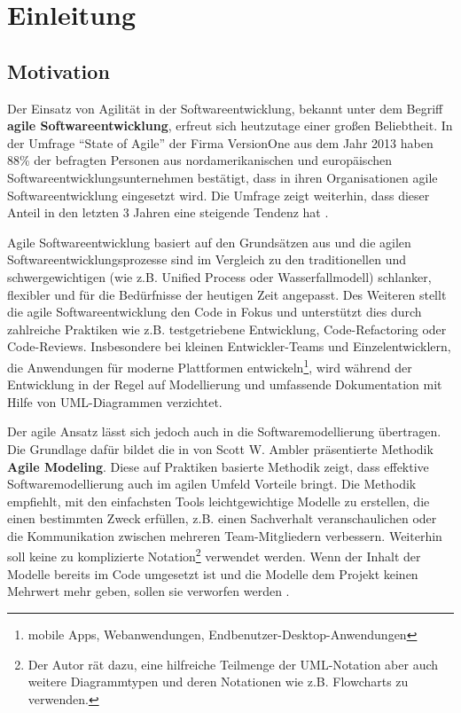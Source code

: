 
\chapter{Einleitung}
\label{chapter:introduction}

\section{Motivation}

Der Einsatz von Agilität in der Softwareentwicklung, bekannt unter dem Begriff \textbf{agile Softwareentwicklung}, erfreut sich heutzutage einer großen Beliebtheit. In der Umfrage \enquote{State of Agile} der Firma VersionOne aus dem Jahr 2013 haben 88\% der befragten Personen aus nordamerikanischen und europäischen Softwareentwicklungsunternehmen bestätigt, dass in ihren Organisationen agile Softwareentwicklung eingesetzt wird. Die Umfrage zeigt weiterhin, dass dieser Anteil in den letzten 3 Jahren eine steigende Tendenz hat \cite{VersionOne148th-Annual}.

Agile Softwareentwicklung basiert auf den Grundsätzen aus \cite{BeckBeedle01Manifest} und die agilen Softwareentwicklungsprozesse sind im Vergleich zu den traditionellen und schwergewichtigen (wie z.B. Unified Process oder Wasserfallmodell) schlanker, flexibler und für die Bedürfnisse der heutigen Zeit angepasst. Des Weiteren stellt die agile Softwareentwicklung den Code in Fokus und unterstützt dies durch zahlreiche Praktiken wie z.B. testgetriebene Entwicklung, Code-Refactoring oder Code-Reviews. Insbesondere bei kleinen Entwickler-Teams und Einzelentwicklern, die Anwendungen für moderne Plattformen entwickeln\footnote{mobile Apps, Webanwendungen, Endbenutzer-Desktop-Anwendungen}, wird während der Entwicklung in der Regel auf Modellierung und umfassende Dokumentation mit Hilfe von UML-Diagrammen verzichtet.

Der agile Ansatz lässt sich jedoch auch in die Softwaremodellierung übertragen. Die Grundlage dafür bildet die in \cite{Ambler02Agile} von Scott W. Ambler präsentierte Methodik \textbf{Agile Modeling}. Diese auf Praktiken basierte Methodik zeigt, dass effektive Softwaremodellierung auch im agilen Umfeld Vorteile bringt. Die Methodik empfiehlt, mit den einfachsten Tools leichtgewichtige Modelle zu erstellen, die einen bestimmten Zweck erfüllen, z.B. einen Sachverhalt  veranschaulichen oder die Kommunikation zwischen mehreren Team-Mitgliedern verbessern. Weiterhin soll keine zu komplizierte Notation\footnote{Der Autor rät dazu, eine hilfreiche Teilmenge der UML-Notation aber auch weitere Diagrammtypen und deren Notationen wie z.B. Flowcharts zu verwenden.} verwendet werden. Wenn der Inhalt der Modelle bereits im Code umgesetzt ist und die Modelle dem Projekt keinen Mehrwert mehr geben, sollen sie verworfen werden \cite{Ambler02Agile}.

